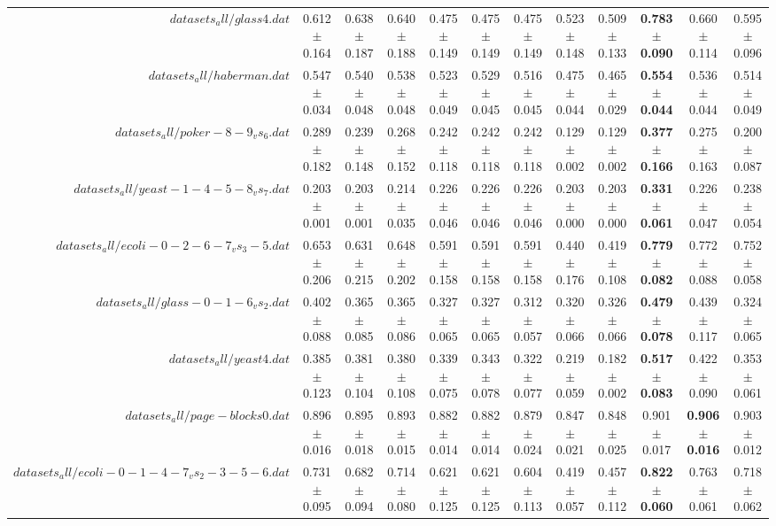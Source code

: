 \begin{table}[!ht]
{\begin{tabular}{r c c c c c c c c c c c}
$datasets_all/glass4.dat$ & 0.612 $\pm$ 0.164 & 0.638 $\pm$ 0.187 & 0.640 $\pm$ 0.188 & 0.475 $\pm$ 0.149 & 0.475 $\pm$ 0.149 & 0.475 $\pm$ 0.149 & 0.523 $\pm$ 0.148 & 0.509 $\pm$ 0.133 & \textbf{0.783 $\pm$ 0.090} & 0.660 $\pm$ 0.114 & 0.595 $\pm$ 0.096 \\
$datasets_all/haberman.dat$ & 0.547 $\pm$ 0.034 & 0.540 $\pm$ 0.048 & 0.538 $\pm$ 0.048 & 0.523 $\pm$ 0.049 & 0.529 $\pm$ 0.045 & 0.516 $\pm$ 0.045 & 0.475 $\pm$ 0.044 & 0.465 $\pm$ 0.029 & \textbf{0.554 $\pm$ 0.044} & 0.536 $\pm$ 0.044 & 0.514 $\pm$ 0.049 \\
$datasets_all/poker-8-9_vs_6.dat$ & 0.289 $\pm$ 0.182 & 0.239 $\pm$ 0.148 & 0.268 $\pm$ 0.152 & 0.242 $\pm$ 0.118 & 0.242 $\pm$ 0.118 & 0.242 $\pm$ 0.118 & 0.129 $\pm$ 0.002 & 0.129 $\pm$ 0.002 & \textbf{0.377 $\pm$ 0.166} & 0.275 $\pm$ 0.163 & 0.200 $\pm$ 0.087 \\
$datasets_all/yeast-1-4-5-8_vs_7.dat$ & 0.203 $\pm$ 0.001 & 0.203 $\pm$ 0.001 & 0.214 $\pm$ 0.035 & 0.226 $\pm$ 0.046 & 0.226 $\pm$ 0.046 & 0.226 $\pm$ 0.046 & 0.203 $\pm$ 0.000 & 0.203 $\pm$ 0.000 & \textbf{0.331 $\pm$ 0.061} & 0.226 $\pm$ 0.047 & 0.238 $\pm$ 0.054 \\
$datasets_all/ecoli-0-2-6-7_vs_3-5.dat$ & 0.653 $\pm$ 0.206 & 0.631 $\pm$ 0.215 & 0.648 $\pm$ 0.202 & 0.591 $\pm$ 0.158 & 0.591 $\pm$ 0.158 & 0.591 $\pm$ 0.158 & 0.440 $\pm$ 0.176 & 0.419 $\pm$ 0.108 & \textbf{0.779 $\pm$ 0.082} & 0.772 $\pm$ 0.088 & 0.752 $\pm$ 0.058 \\
$datasets_all/glass-0-1-6_vs_2.dat$ & 0.402 $\pm$ 0.088 & 0.365 $\pm$ 0.085 & 0.365 $\pm$ 0.086 & 0.327 $\pm$ 0.065 & 0.327 $\pm$ 0.065 & 0.312 $\pm$ 0.057 & 0.320 $\pm$ 0.066 & 0.326 $\pm$ 0.066 & \textbf{0.479 $\pm$ 0.078} & 0.439 $\pm$ 0.117 & 0.324 $\pm$ 0.065 \\
$datasets_all/yeast4.dat$ & 0.385 $\pm$ 0.123 & 0.381 $\pm$ 0.104 & 0.380 $\pm$ 0.108 & 0.339 $\pm$ 0.075 & 0.343 $\pm$ 0.078 & 0.322 $\pm$ 0.077 & 0.219 $\pm$ 0.059 & 0.182 $\pm$ 0.002 & \textbf{0.517 $\pm$ 0.083} & 0.422 $\pm$ 0.090 & 0.353 $\pm$ 0.061 \\
$datasets_all/page-blocks0.dat$ & 0.896 $\pm$ 0.016 & 0.895 $\pm$ 0.018 & 0.893 $\pm$ 0.015 & 0.882 $\pm$ 0.014 & 0.882 $\pm$ 0.014 & 0.879 $\pm$ 0.024 & 0.847 $\pm$ 0.021 & 0.848 $\pm$ 0.025 & 0.901 $\pm$ 0.017 & \textbf{0.906 $\pm$ 0.016} & 0.903 $\pm$ 0.012 \\
$datasets_all/ecoli-0-1-4-7_vs_2-3-5-6.dat$ & 0.731 $\pm$ 0.095 & 0.682 $\pm$ 0.094 & 0.714 $\pm$ 0.080 & 0.621 $\pm$ 0.125 & 0.621 $\pm$ 0.125 & 0.604 $\pm$ 0.113 & 0.419 $\pm$ 0.057 & 0.457 $\pm$ 0.112 & \textbf{0.822 $\pm$ 0.060} & 0.763 $\pm$ 0.061 & 0.718 $\pm$ 0.062 \\

\end{tabular}}
\end{table}
